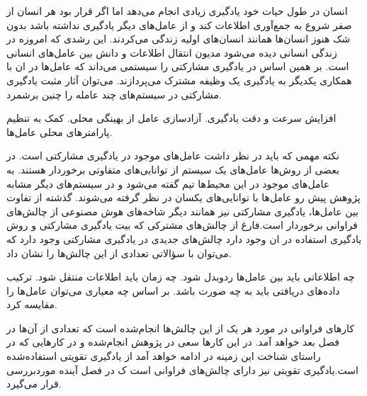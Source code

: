 انسان در طول حیات خود یادگیری زیادی انجام می‌دهد اما اگر قرار بود هر انسان از  صفر شروع به جمع‌آوری اطلاعات کند و از عامل‌های دیگر یادگیری نداشته باشد بدون شک هنوز انسان‌ها همانند انسان‌های اولیه زندگی می‌کردند. این رشدی که امروزه در زندگی انسانی دیده می‌شود مدیون انتقال اطلاعات و دانش بین عامل‌های انسانی است. بر همین اساس در یادگیری مشارکتی را سیستمی می‌داند که عامل‌ها در ان با همکاری یکدیگر به یادگیری یک وظیفه مشترک می‌پردازند. می‌توان آثار مثبت یادگیری مشارکتی در سیستم‌های چند عامله را چنین برشمرد.

\begin{itemize}\setlength\itemsep{-.5em}
 افزایش سرعت و دقت یادگیری.
 آزادسازی عامل از بهینگی محلی.
 کمک به تنظیم پارامترهای محلی عامل‌ها.
\end{itemize}

نکته مهمی که باید در نظر داشت عامل‌های موجود در یادگیری مشارکتی است. در بعضی از روش‌ها عامل‌های یک سیستم از توانایی‌های متفاوتی برخوردار هستند. به عامل‌های موجود در این محیط‌ها تیم گفته می‌شود و در سیستم‌های دیگر مشابه پژوهش پیش رو عامل‌ها با توانایی‌های یکسان در نظر گرفته می‌شوند. گذشته از تفاوت بین عامل‌ها، یادگیری مشارکتی نیز همانند دیگر شاخه‌های هوش مصنوعی از چالش‌های فراوانی برخوردار است.فارغ از چالش‌های مشترکی که بیت یادگیری مشارکتی و روش یادگیری استفاده در ان وجود دارد چالش‌های جدیدی در یادگیری مشارکتی وجود دارد که می‌توان با سؤالاتی تعدادی از این چالش‌ها را نشان داد.

\begin{itemize}\setlength\itemsep{-.5em}
 چه اطلاعاتی باید بین عامل‌ها ردوبدل شود.
 چه زمان باید اطلاعات منتقل شود.
 ترکیب داده‌های دریافتی باید به چه صورت باشد.
 بر اساس چه معیاری می‌توان عامل‌ها را مقایسه کرد.
\end{itemize}

کارهای فراوانی در مورد هر یک از این چالش‌ها انجام‌شده است که تعدادی از آن‌ها در فصل بعد خواهد آمد. در این کارها سعی در پژوهش انجام‌شده و در کارهایی که در راستای شناخت این زمینه در ادامه خواهد آمد از یادگیری تقویتی استفاده‌شده است.یادگیری تقویتی نیز دارای چالش‌های فراوانی است ک در فصل آینده موردبررسی قرار می‌گیرد.